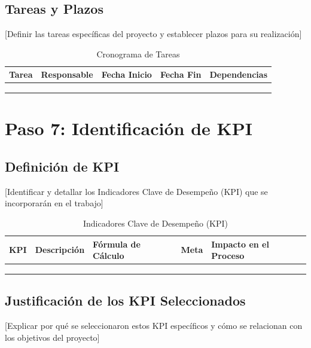 \documentclass[12pt,letterpaper]{report}
\begin{document}
\subsection{Tareas y Plazos}
[Definir las tareas específicas del proyecto y establecer plazos para su realización]

\begin{table}[H]
    \centering
    \begin{tabularx}{\textwidth}{|X|X|X|X|X|}
        \hline
        \textbf{Tarea} & \textbf{Responsable} & \textbf{Fecha Inicio} & \textbf{Fecha Fin} & \textbf{Dependencias} \\
        \hline
        & & & & \\
        \hline
        & & & & \\
        \hline
        & & & & \\
        \hline
    \end{tabularx}
    \caption{Cronograma de Tareas}
\end{table}

\section{Paso 7: Identificación de KPI}

\subsection{Definición de KPI}
[Identificar y detallar los Indicadores Clave de Desempeño (KPI) que se incorporarán en el trabajo]

\begin{table}[H]
    \centering
    \begin{tabularx}{\textwidth}{|X|X|X|X|X|}
        \hline
        \textbf{KPI} & \textbf{Descripción} & \textbf{Fórmula de Cálculo} & \textbf{Meta} & \textbf{Impacto en el Proceso} \\
        \hline
        & & & & \\
        \hline
        & & & & \\
        \hline
        & & & & \\
        \hline
    \end{tabularx}
    \caption{Indicadores Clave de Desempeño (KPI)}
\end{table}

\subsection{Justificación de los KPI Seleccionados}
[Explicar por qué se seleccionaron estos KPI específicos y cómo se relacionan con los objetivos del proyecto]
\end{document}
